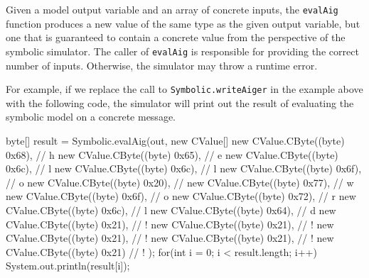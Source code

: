 \documentclass[11pt]{article}
\begin{document}
Given a model output variable and an array of concrete inputs, the
\texttt{evalAig} function produces a new value of the same type as the
given output variable, but one that is guaranteed to contain a
concrete value from the perspective of the symbolic simulator. The
caller of \texttt{evalAig} is responsible for providing the correct
number of inputs. Otherwise, the simulator may throw a runtime error.

For example, if we replace the call to \texttt{Symbolic.writeAiger}
in the example above with the following code, the simulator will print
out the result of evaluating the symbolic model on a concrete message.

\begin{code}
byte[] result = Symbolic.evalAig(out,
  new CValue[] {
    new CValue.CByte((byte) 0x68), // h
    new CValue.CByte((byte) 0x65), // e
    new CValue.CByte((byte) 0x6c), // l
    new CValue.CByte((byte) 0x6c), // l
    new CValue.CByte((byte) 0x6f), // o
    new CValue.CByte((byte) 0x20), // 
    new CValue.CByte((byte) 0x77), // w
    new CValue.CByte((byte) 0x6f), // o
    new CValue.CByte((byte) 0x72), // r
    new CValue.CByte((byte) 0x6c), // l
    new CValue.CByte((byte) 0x64), // d
    new CValue.CByte((byte) 0x21), // !
    new CValue.CByte((byte) 0x21), // !
    new CValue.CByte((byte) 0x21), // !
    new CValue.CByte((byte) 0x21), // !
    new CValue.CByte((byte) 0x21)  // !
  });
for(int i = 0; i < result.length; i++) {
  System.out.println(result[i]);
}
\end{code}



\end{document}
